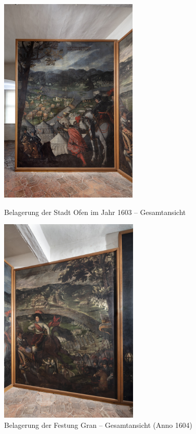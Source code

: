 \documentclass[
  a4paper,
]{book}
\begin{document}
\begin{figure}
\includegraphics[height=10cm]{images/fmd10005844a.jpg}

\caption{Belagerung der Stadt Ofen im Jahr 1603 – Gesamtansicht}
\label{fig:{images/fmd10005844a.jpg}}

\clearpage

\centering

\includegraphics[height=10cm]{images/fmd10005845a.jpg}

\caption{Belagerung der Festung Gran – Gesamtansicht (Anno 1604)}
\label{fig:{images/fmd10005845a.jpg}}

\clearpage

\centering


\end{figure}
\end{document}
